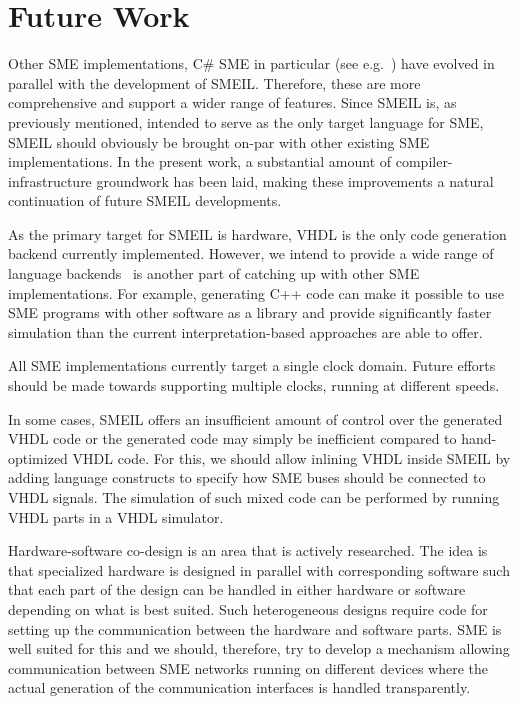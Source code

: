 \section{Future Work}
Other SME implementations, C\# SME in particular (see
e.g.~\cite{skovhede2018statemachine}) have evolved in parallel with the
development of SMEIL. Therefore, these are more comprehensive and support a
wider range of features. Since SMEIL is, as previously mentioned, intended to
serve as the only target language for SME, SMEIL should obviously be brought
on-par with other existing SME implementations. In the present work, a
substantial amount of compiler-infrastructure groundwork has been laid, making
these improvements a natural continuation of future SMEIL developments.

As the primary target for SMEIL is hardware, VHDL is the only code generation
backend currently implemented. However, we intend to provide a wide range of
language backends~\cite{skovhede2017c++} is another part of catching up with
other SME implementations. For example, generating C++ code can make it possible
to use SME programs with other software as a library and provide significantly
faster simulation than the current interpretation-based approaches are able to
offer.

All SME implementations currently target a single clock domain. Future efforts
should be made towards supporting multiple clocks, running at different speeds.

In some cases, SMEIL offers an insufficient amount of control over the generated
VHDL code or the generated code may simply be inefficient compared to
hand-optimized VHDL code. For this, we should allow inlining VHDL inside SMEIL
by adding language constructs to specify how SME buses should be connected to
VHDL signals. The simulation of such mixed code can be performed by running VHDL
parts in a VHDL simulator.

Hardware-software co-design is an area that is actively researched. The idea is
that specialized hardware is designed in parallel with corresponding software
such that each part of the design can be handled in either hardware or software
depending on what is best suited. Such heterogeneous designs require code for
setting up the communication between the hardware and software parts. SME is
well suited for this and we should, therefore, try to develop a mechanism
allowing communication between SME networks running on different devices where
the actual generation of the communication interfaces is handled transparently.

